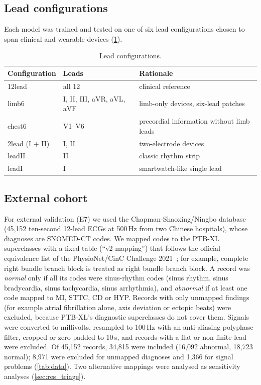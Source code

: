 \subsection{Lead configurations}
Each model was trained and tested on one of six lead configurations chosen to span clinical and wearable devices (\cref{tab:leads}).

\begin{table}[H]
\centering
\small
\caption{Lead configurations.}
\label{tab:leads}
\begin{tabular}{lll}
\toprule
Configuration & Leads & Rationale \\
\midrule
12lead & all 12 & clinical reference \\
limb6 & I, II, III, aVR, aVL, aVF & limb-only devices, six-lead patches \\
chest6 & V1--V6 & precordial information without limb leads \\
2lead (I + II) & I, II & two-electrode devices \\
leadII & II & classic rhythm strip \\
leadI & I & smartwatch-like single lead \\
\bottomrule
\end{tabular}
\end{table}

\subsection{External cohort}
For external validation (E7) we used the Chapman-Shaoxing/Ningbo database~\cite{zheng2022physionet,zheng2020chapman} (45,152 ten-second 12-lead ECGs at 500\,Hz from two Chinese hospitals), whose diagnoses are SNOMED-CT codes. We mapped codes to the PTB-XL superclasses with a fixed table (``v2 mapping'') that follows the official equivalence list of the PhysioNet/CinC Challenge 2021~\cite{reyna2021willtwodo}; for example, complete right bundle branch block is treated as right bundle branch block. A record was \emph{normal} only if all its codes were sinus-rhythm codes (sinus rhythm, sinus bradycardia, sinus tachycardia, sinus arrhythmia), and \emph{abnormal} if at least one code mapped to MI, STTC, CD or HYP. Records with only unmapped findings (for example atrial fibrillation alone, axis deviation or ectopic beats) were excluded, because PTB-XL's diagnostic superclasses do not cover them. Signals were converted to millivolts, resampled to 100\,Hz with an anti-aliasing polyphase filter, cropped or zero-padded to 10\,s, and records with a flat or non-finite lead were excluded. Of 45,152 records, 34,815 were included (16,092 abnormal, 18,723 normal); 8,971 were excluded for unmapped diagnoses and 1,366 for signal problems (\cref{tab:data}). Two alternative mappings were analysed as sensitivity analyses (\cref{sec:res_triage}).

